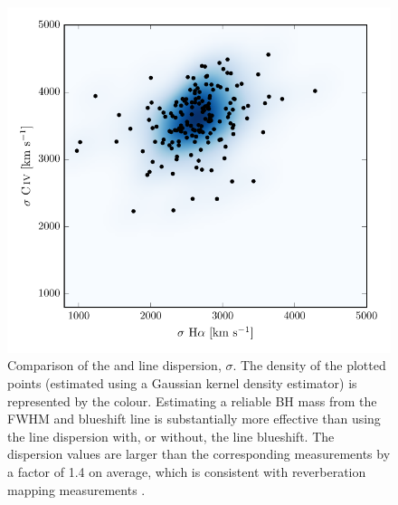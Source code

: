 \begin{figure}
    \includegraphics[width=\columnwidth]{figures/chapter03/dispersion_comparison.pdf} 
    \caption{Comparison of the  and \ha line dispersion, $\sigma$. The density of the plotted points (estimated using a Gaussian kernel density estimator) is represented by the colour. Estimating a reliable BH mass from the  FWHM and blueshift line is substantially more effective than using the  line dispersion with, or without, the line blueshift. The  dispersion values are larger than the corresponding \ha measurements by a factor of 1.4 on average, which is consistent with reverberation mapping measurements \citep{vestergaard06}.} 
    \label{fig:dispersion_comparison}
\end{figure}


